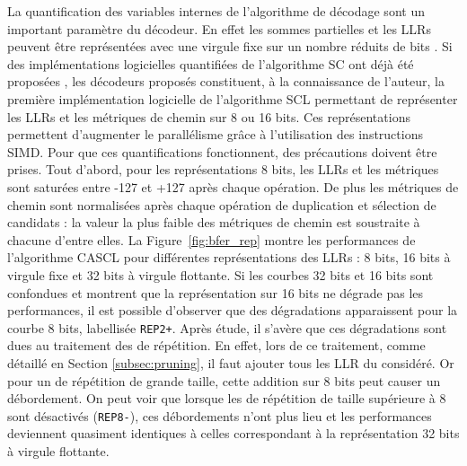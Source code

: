 La quantification des variables internes de l'algorithme de décodage sont un important paramètre du décodeur. En effet les sommes partielles et les LLRs peuvent être représentées avec une virgule fixe sur un nombre réduits de bits \cite{balatsoukas-stimming_llr-based_2015}. Si des implémentations logicielles quantifiées de l'algorithme SC ont déjà été proposées \cite{giard_low-latency_2016}, les décodeurs proposés constituent, à la connaissance de l'auteur, la première implémentation logicielle de l'algorithme SCL permettant de représenter les LLRs et les métriques de chemin sur 8 ou 16 bits. Ces représentations permettent d'augmenter le parallélisme grâce à l'utilisation des instructions SIMD. Pour que ces quantifications fonctionnent, des précautions doivent être prises. Tout d'abord, pour les représentations 8 bits, les LLRs et les métriques sont saturées entre -127 et +127 après chaque opération. De plus les métriques de chemin sont normalisées après chaque opération de duplication et sélection de candidats : la valeur la plus faible des métriques de chemin est soustraite à chacune d'entre elles. La Figure~\ref{fig:bfer_rep} montre les performances de l'algorithme CASCL pour différentes représentations des LLRs : 8 bits, 16 bits à virgule fixe et 32 bits à virgule flottante. Si les courbes 32 bits et 16 bits sont confondues et montrent que la représentation sur 16 bits ne dégrade pas les performances, il est possible d'observer que des dégradations apparaissent pour la courbe 8 bits, labellisée \texttt{REP2+}. Après étude, il s'avère que ces dégradations sont dues au traitement des \noeuds de répétition. En effet, lors de ce traitement, comme détaillé en Section \ref{subsec:pruning}, il faut ajouter tous les LLR du \noeud considéré. Or pour un \noeud de répétition de grande taille, cette addition sur 8 bits peut causer un débordement. On peut voir que lorsque les \noeuds de répétition de taille supérieure à 8 sont désactivés (\texttt{REP8-}), ces débordements n'ont plus lieu et les performances deviennent quasiment identiques à celles correspondant à la représentation 32 bits à virgule flottante.
